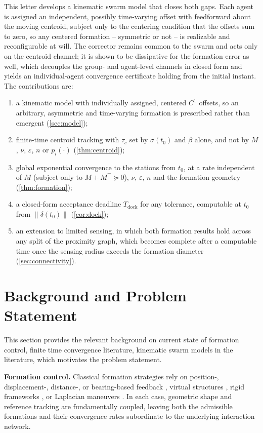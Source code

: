 \documentclass[letterpaper, 10 pt, conference]{ieeeconf}
\newcommand{\norm}[1]{\left\lVert #1 \right\rVert}
\begin{document}
This letter develops a kinematic swarm model that closes both gaps.
Each agent is assigned an independent, possibly time-varying offset
with feedforward about the moving centroid, subject only to the
centering condition that the offsets sum to zero, so any centered
formation -- symmetric or not -- is realizable and reconfigurable at
will. The corrector remains common to the swarm and acts only on the
centroid channel; it is shown to be dissipative for the formation
error as well, which decouples the group- and agent-level channels in
closed form and yields an individual-agent convergence certificate
holding from the initial instant. The contributions are:
\begin{enumerate}
\item a kinematic model with individually assigned, centered $C^1$
      offsets, so an arbitrary, asymmetric and time-varying formation
      is prescribed rather than emergent (\cref{sec:model});
\item finite-time centroid tracking with $\tau_c$ set by
      $\sigma(t_0)$ and $\beta$ alone, and not by $M$, $\nu$,
      $\varepsilon$, $n$ or $p_i(\cdot)$ (\cref{thm:centroid});
\item global exponential convergence to the stations from $t_0$, at a
      rate independent of $M$ (subject only to $M+M^\top\succeq0$), $\nu$, $\varepsilon$,
      $n$ and the formation geometry (\cref{thm:formation});
\item a closed-form acceptance deadline $T_{\mathrm{dock}}$ for any
      tolerance, computable at $t_0$ from $\norm{\delta(t_0)}$
      (\cref{cor:dock});
\item an extension to limited sensing, in which both formation results
      hold across any split of the proximity graph, which becomes
      complete after a computable time once the sensing radius exceeds
      the formation diameter (\cref{sec:connectivity}).
\end{enumerate}

\section{Background and Problem Statement}
\label{sec:related}

This section provides the relevant background on current state of formation control, finite time convergence literature, kinematic swarm models in the literature, which motivates the problem statement.

\noindent
\textbf{Formation control.} Classical formation strategies rely on position-, displacement-, distance-, or bearing-based feedback \cite{oh2015survey,su2026bearing}, virtual structures \cite{lewis1997high}, rigid frameworks \cite{anderson2008rigid}, or Laplacian maneuvers \cite{garciademarina2021distributed}. In each case, geometric shape and reference tracking are fundamentally coupled, leaving both the admissible formations and their convergence rates subordinate to the underlying interaction network.
\end{document}
